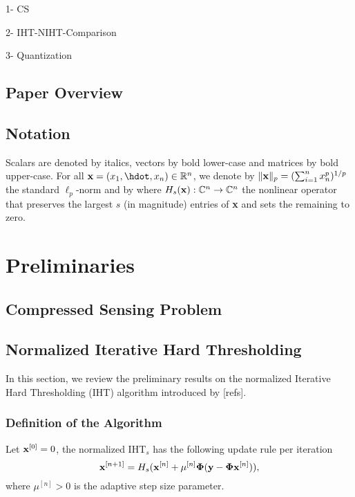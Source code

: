 \documentclass{article}
\begin{document}
1- CS

2- IHT-NIHT-Comparison

3- Quantization

\subsection{Paper Overview}
\subsection{Notation}
Scalars are denoted by italics, vectors by bold lower-case and matrices by bold upper-case. For all ${\bf x}= (x_1, \hdot, x_n) \in \mathbb{R}^n$, we denote by $\|{\bf x}\|_p = (\sum_{i=1}^n x_n^p)^{1/p}$ the standard ${\ell}_p$-norm and by
where $H_s({\bf x}): \mathbb{C}^n \rightarrow \mathbb{C}^n$ the nonlinear operator that preserves the largest $s$ (in magnitude) entries of {\bf x} and sets the remaining to zero. 
\section{Preliminaries}
\subsection{Compressed Sensing Problem}
\subsection{Normalized Iterative Hard Thresholding}
In this section, we review the preliminary results on the normalized Iterative Hard Thresholding (IHT) algorithm introduced by [refs].

\subsubsection{Definition of the Algorithm} 
Let ${\bf x}^{[0]} = 0$, the normalized IHT$_s$ has the following update rule per iteration
\begin{equation}
{\bf x}^{[n+1]} = H_s({\bf x}^{[n]} + \mu^{[n]}{\bf \Phi}({\bf y}-{\bf \Phi}{\bf x}^{[n]})),
\end{equation}
where $\mu^{[n]}>0$ is the adaptive step size parameter. %
\end{document}

